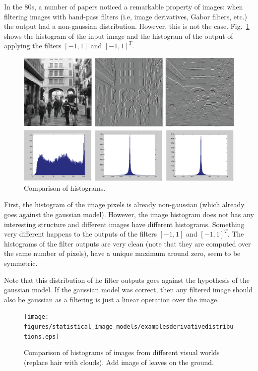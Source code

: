 In the 80s, a number of papers noticed a remarkable property of images: when filtering images with band-pass filters (i.e, image derivatives, Gabor filters, etc.) the output had a non-gaussian distribution.  However, this is not the case. Fig.~\ref{fig:derivativeshist} shows the histogram of the input image and the histogram of the output of applying the filters $\left[-1,1\right]$ and $\left[-1,1\right]^T$.


\begin{figure}[htpb]
  \centerline{
    \includegraphics[width=1\linewidth]{figures/statistical_image_models/derivativedistribution.eps}
  }
  \caption{Comparison of histograms.}
  \label{fig:derivativeshist}
\end{figure}

First, the histogram of the image pixels is already non-gaussian (which already goes against the gaussian model). However, the image histogram does not has any interesting structure and different images have different histograms. Something very different happens to the outputs of the filters  $\left[-1,1\right]$ and $\left[-1,1\right]^T$. The histograms of the filter outputs are very clean (note that they are computed over the same number of pixels), have a unique maximum around zero, seem to be symmetric.

Note that this distribution of he filter outputs goes against the hypothesis of the gaussian model. If the gaussian model was correct, then any filtered image should also be gaussian as a filtering is just a linear operation over the image.

\begin{figure}[htpb]
  \centerline{
    \texttt{[image: figures/statistical\_image\_models/examplesderivativedistributions.eps]}
  }
  \caption{Comparison of histograms of images from different visual worlds (replace hair with clouds). Add image of leaves on the ground.}
  \label{fig:derivativesdistributions}
\end{figure}



